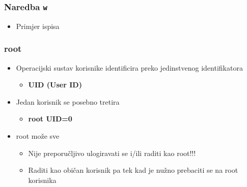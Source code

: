 \documentclass[table,usenames,dvipsnames] {beamer}
\newcommand{\shell}[1]{\texttt{#1}}
\begin{document}
\begin{frame}[t]
\frametitle{Naredba \shell{w}}
\begin{itemize}
  \item Primjer ispisa
    \begin{table}[h]\footnotesize
    \end{table}
\end{itemize}
\end{frame}

\begin{frame}[t]
\frametitle{root} 
\begin{itemize}
  \item Operacijski sustav korisnike identificira preko jedinstvenog identifikatora
  \begin{itemize}
	  \item[] \textbf{UID (User ID)}
  \end{itemize}
\end{itemize}
\begin{itemize}
  \item Jedan korisnik se posebno tretira 
  \begin{itemize}
    \item[] \bf{root} \hspace{2em} UID=0
  \end{itemize}
\end{itemize}
\begin{itemize}
  \item root može sve
  \begin{itemize}
    \item Nije preporučljivo ulogiravati se i/ili raditi kao root!!!
    \item Raditi kao običan korisnik pa tek kad je nužno prebaciti se na 
          root korisnika
  \end{itemize}
\end{itemize}
\end{frame}
\end{document}
